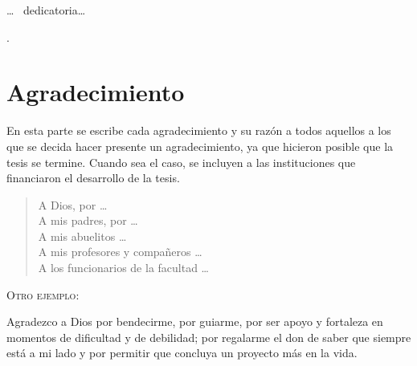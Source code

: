 \documentclass[12pt,a4paper,oneside,reqno]{book}%
\theoremstyle{definition}
\begin{document}
\newpage %
\thispagestyle{empty}
\vspace*{19cm}

\begin{flushright}
\begin{minipage}{6cm}
{\baselineskip 20pt
\ldots~ dedicatoria\dots} %
\end{minipage}
\end{flushright}

\pagestyle{plain}  \setcounter{page}{6}

\tableofcontents %
\listoffigures.%
\chapter*{Agradecimiento}
\thispagestyle{empty}
\vspace{-0.5cm}
En esta parte se escribe cada agradecimiento y su raz\'on a todos aquellos a los que se decida hacer presente un agradecimiento, ya que hicieron posible que la tesis se termine.
Cuando sea el caso, se incluyen a las instituciones que financiaron el desarrollo de la tesis.
\begin{verse}
A Dios, por \dots\\
A mis padres, por \dots\\
A mis abuelitos \dots\\
A mis profesores y compa\~{n}eros \dots\\
A los funcionarios de la facultad \dots\\
\end{verse}

\textsc{Otro ejemplo:}

Agradezco a Dios por bendecirme, por guiarme, por ser apoyo y fortaleza en momentos de dificultad y de debilidad; por regalarme el don de saber que siempre est\'a a mi lado y por permitir que concluya un proyecto m\'as en la vida.






%
%


\newpage%
\clearpage
{}
\backmatter
\printindex
\end{document}
